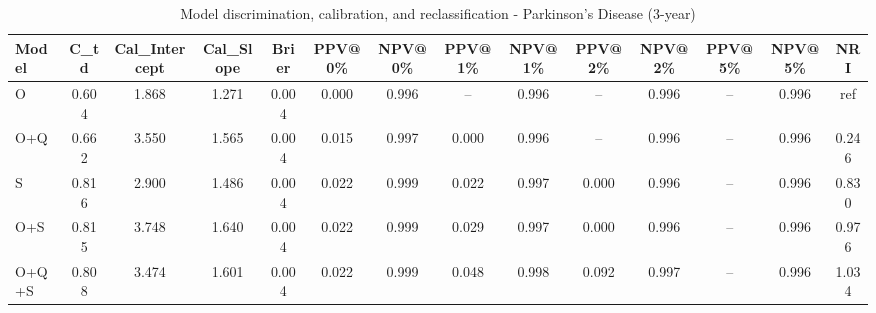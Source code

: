 \begin{table}[htbp]
\centering
\small
\caption{Model discrimination, calibration, and reclassification - Parkinson's Disease (3-year)}
\label{tab:perf_pd_3y}
\begin{tabular}{lccccccccccccc}
\toprule
Model & C\_td & Cal\_Intercept & Cal\_Slope & Brier & PPV@0\% & NPV@0\% & PPV@1\% & NPV@1\% & PPV@2\% & NPV@2\% & PPV@5\% & NPV@5\% & NRI \\
\midrule
O & 0.604 & 1.868 & 1.271 & 0.004 & 0.000 & 0.996 & -- & 0.996 & -- & 0.996 & -- & 0.996 & ref \\
O+Q & 0.662 & 3.550 & 1.565 & 0.004 & 0.015 & 0.997 & 0.000 & 0.996 & -- & 0.996 & -- & 0.996 & 0.246 \\
S & 0.816 & 2.900 & 1.486 & 0.004 & 0.022 & 0.999 & 0.022 & 0.997 & 0.000 & 0.996 & -- & 0.996 & 0.830 \\
O+S & 0.815 & 3.748 & 1.640 & 0.004 & 0.022 & 0.999 & 0.029 & 0.997 & 0.000 & 0.996 & -- & 0.996 & 0.976 \\
O+Q+S & 0.808 & 3.474 & 1.601 & 0.004 & 0.022 & 0.999 & 0.048 & 0.998 & 0.092 & 0.997 & -- & 0.996 & 1.034 \\
\bottomrule
\end{tabular}
\end{table}